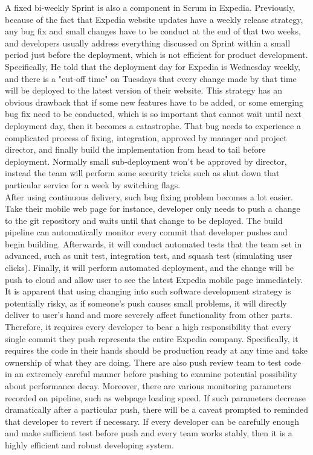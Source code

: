 \documentclass[11pt]{article}
\begin{document}
A fixed bi-weekly Sprint is also a component in Scrum in Expedia. Previously, because of the fact that Expedia website updates have a weekly release strategy, any bug fix and small changes have to be conduct at the end of that two weeks, and developers usually address everything discussed on Sprint within a small period just before the deployment, which is not efficient for product development. Specifically, He told that the deployment day for Expedia is Wednesday weekly, and there is a "cut-off time" on Tuesdays that every change made by that time will be deployed to the latest version of their website. This strategy has an obvious drawback that if some new features have to be added, or some emerging bug fix need to be conducted, which is so important that cannot wait until next deployment day, then it becomes a catastrophe. That bug needs to experience a complicated process of fixing, integration, approved by manager and project director, and finally build the implementation from head to tail before deployment. Normally small sub-deployment won't be approved by director, instead the team will perform some security tricks such as shut down that particular service for a week by switching flags. \\[10px]
After using continuous delivery, such bug fixing problem becomes a lot easier. Take their mobile web page for instance, developer only needs to push a change to the git repository and waits until that change to be deployed. The build pipeline can automatically monitor every commit that developer pushes and begin building. Afterwards, it will conduct automated tests that the team set in advanced, such as unit test, integration test, and squash test (simulating user clicks). Finally, it will perform automated deployment, and the change will be push to cloud and allow user to see the latest Expedia mobile page immediately. It is apparent that using changing into such software development strategy is potentially risky, as if someone's push causes small problems, it will directly deliver to user's hand and more severely affect functionality from other parts. Therefore, it requires every developer to bear a high responsibility that every single commit they push represents the entire Expedia company. Specifically, it requires the code in their hands should be production ready at any time and take ownership of what they are doing. There are also push review team to test code in an extremely careful manner before pushing to examine potential possibility about performance decay. Moreover, there are various monitoring parameters recorded on pipeline, such as webpage loading speed. If such parameters decrease dramatically after a particular push, there will be a caveat prompted to reminded that developer to revert if necessary. If every developer can be carefully enough and make sufficient test before push and every team works stably, then it is a highly efficient and robust developing system. \\[10px]
\end{document}

